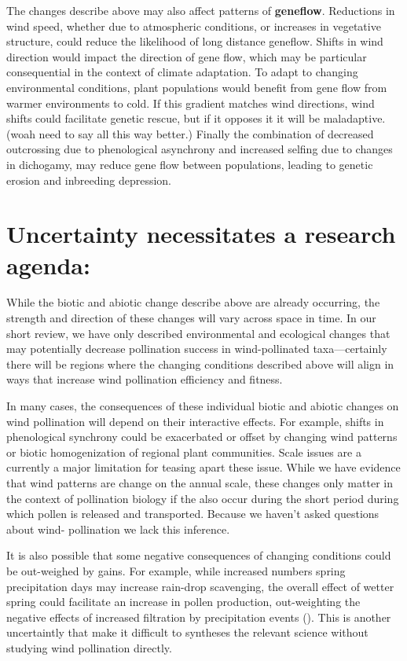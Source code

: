 \documentclass[12pt]{article}
\begin{document}
The changes describe above may also affect patterns of \textbf{geneflow}. Reductions in wind speed, whether due to atmospheric conditions, or increases in vegetative structure, could reduce the likelihood of long distance geneflow. Shifts in wind direction would impact the direction of gene flow, which may be particular consequential in the context of climate adaptation. To adapt to changing environmental conditions, plant populations would benefit from gene flow from warmer environments to cold. If this gradient matches wind directions, wind shifts could facilitate genetic rescue, but if it opposes it it will be maladaptive. (woah need to say all this way better.) Finally the combination of decreased outcrossing due to phenological asynchrony and increased selfing due to changes in dichogamy, may reduce gene flow between populations, leading to genetic erosion and inbreeding depression.





\section*{Uncertainty necessitates a research agenda:}

While the biotic and abiotic change describe above are already occurring, the strength and direction of these changes will vary across space in time. In our short review, we have only described environmental and ecological changes that may potentially decrease pollination success in wind-pollinated taxa---certainly there will be regions where the changing conditions described above will align in ways that increase wind pollination efficiency and fitness. 

In many cases, the consequences of these individual biotic and abiotic changes on wind pollination will depend on their interactive effects. For example, shifts in phenological synchrony could be exacerbated or offset by changing wind patterns or biotic homogenization of regional plant communities. Scale issues are a currently a major limitation for teasing apart these issue. While we have evidence that wind patterns are change on the annual scale, these changes only matter in the context of pollination biology if the also occur during the short period during which pollen is released and transported. Because we haven't asked questions about wind- pollination we lack this inference.


It is also possible that some negative consequences of changing conditions could be out-weighed by gains. For example, while increased numbers spring precipitation days may increase rain-drop scavenging, the overall effect of wetter spring could facilitate an increase in pollen production, out-weighting the negative effects of increased filtration by precipitation events (). This is another uncertaintly that make it difficult to syntheses the relevant science without studying wind pollination directly.
\end{document}
